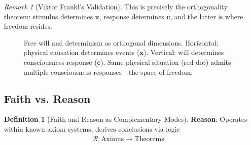 \documentclass[11pt,a4paper]{article}
\theoremstyle{definition}
\newtheorem{definition}{Definition}[section]
\theoremstyle{remark}
\newtheorem{remark}{Remark}[section]
\newcommand{\cc}{\mathbf{c}}
\begin{document}
\begin{enumerate}
\begin{remark}[Viktor Frankl's Validation]
This is precisely the orthogonality theorem: stimulus determines \(\mathbf{x}\), response determines \(\cc\), and the latter is where freedom resides.
\end{remark}

\begin{figure}[H]
\centering
{}
\caption{Free will and determinism as orthogonal dimensions. Horizontal: physical causation determines events (\(\mathbf{x}\)). Vertical: will determines consciousness response (\(\cc\)). Same physical situation (red dot) admits multiple consciousness responses—the space of freedom.}
\label{fig:freewill_determinism}
\end{figure}

\subsection{Faith vs. Reason}

\begin{definition}[Faith and Reason as Complementary Modes]
\textbf{Reason}: Operates within known axiom systems, derives conclusions via logic
\begin{align}
\mathcal{R}: \text{Axioms} \to \text{Theorems}
\end{align}


\end{definition}
\end{enumerate}
\end{document}
